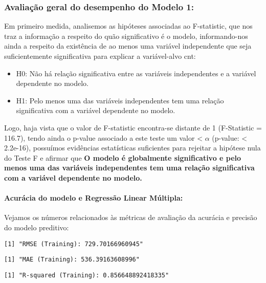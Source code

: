 \documentclass[
  letterpaper,
  DIV=11,
  numbers=noendperiod]{scrartcl}
\let\oldparagraph\paragraph
\renewcommand{\paragraph}[1]{\oldparagraph{#1}\mbox{}}
\begin{document}
\subsubsection{Avaliação geral do desempenho do Modelo
1:}\label{avaliauxe7uxe3o-geral-do-desempenho-do-modelo-1}

Em primeiro medida, analisemos as hipóteses associadas ao F-statistic,
que nos traz a informação a respeito do quão significativo é o modelo,
informando-nos ainda a respeito da existência de ao menos uma variável
independente que seja suficientemente significativa para explicar a
variável-alvo cnt:

\begin{itemize}
\item
  H0: Não há relação significativa entre as variáveis independentes e a
  variável dependente no modelo.
\item
  H1: Pelo menos uma das variáveis independentes tem uma relação
  significativa com a variável dependente no modelo.
\end{itemize}

Logo, haja vista que o valor de F-statistic encontra-se distante de 1
(F-Statistic = 116.7), tendo ainda o p-value associado a este teste um
valor \textless{} \(\alpha\) (p-value: \textless{} 2.2e-16), possuímos
evidências estatísticas suficientes para rejeitar a hipótese nula do
Teste F e afirmar que \textbf{O modelo é globalmente significativo e
pelo menos uma das variáveis independentes tem uma relação significativa
com a variável dependente no modelo.}

\paragraph{Acurácia do modelo e Regressão Linear
Múltipla:}\label{acuruxe1cia-do-modelo-e-regressuxe3o-linear-muxfaltipla}

Vejamos os números relacionados às métricas de avaliação da acurácia e
precisão do modelo preditivo:

\begin{verbatim}
[1] "RMSE (Training): 729.70166960945"
\end{verbatim}

\begin{verbatim}
[1] "MAE (Training): 536.39163608996"
\end{verbatim}

\begin{verbatim}
[1] "R-squared (Training): 0.856648892418335"
\end{verbatim}
\end{document}
